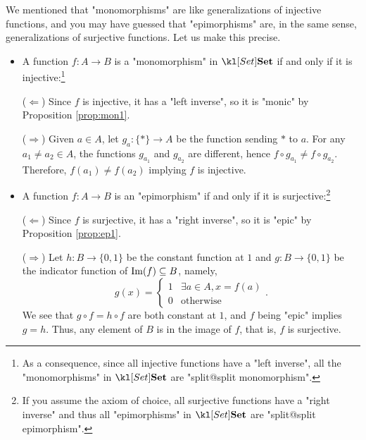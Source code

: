 \documentclass[main.tex]{subfiles}
\begin{document}
\begin{exmp}[$\catSet$]
	We mentioned that "monomorphisms" are like generalizations of injective functions, and you may have guessed that "epimorphisms" are, in the same sense, generalizations of surjective functions. Let us make this precise.
	\begin{itemize}
		\item A function $f:A\rightarrow B$ is a "monomorphism" in $\catSet$ if and only if it is injective:\footnote{As a consequence, since all injective functions have a "left inverse", all the "monomorphisms" in $\catSet$ are "split@split monomorphism".}
		
		($\Leftarrow$) Since $f$ is injective, it has a "left inverse", so it is "monic" by Proposition \ref{prop:mon1}.
		
		($\Rightarrow$) Given $a \in A$, let $g_a: \{\ast\} \rightarrow A$ be the function sending $\ast$ to $a$. For any $a_1 \neq a_2 \in A$, the functions $g_{a_1}$ and $g_{a_2}$ are different, hence $f \circ g_{a_1} \neq f \circ g_{a_2}$. Therefore, $f(a_1) \neq f(a_2)$ implying $f$ is injective.
		
		\item A function $f:A\rightarrow B$ is an "epimorphism" if and only if it is surjective:\footnote{If you assume the axiom of choice, all surjective functions have a "right inverse" and thus all "epimorphisms" in $\catSet$ are "split@split epimorphism".}
		
		($\Leftarrow$) Since $f$ is surjective, it has a "right inverse", so it is "epic" by Proposition \ref{prop:ep1}.
		
		($\Rightarrow$) Let $h: B \rightarrow \{0,1\}$ be the constant function at $1$ and $g:B \rightarrow \{0,1\}$ be the indicator function of $\operatorname{Im}(f) \subseteq B$, namely, \[g(x) = \begin{cases}1&\exists a \in A, x = f(a)\\0&\text{otherwise}\end{cases}.\]
		We see that $g \circ f = h\circ f$ are both constant at $1$, and $f$ being "epic" implies $g = h$. Thus, any element of $B$ is in the image of $f$, that is, $f$ is surjective.
	\end{itemize}
\end{exmp}
\end{document}
